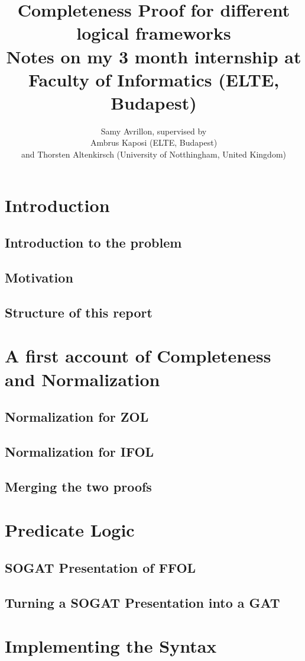 \documentclass[10pt,a4paper]{article}
\title{Completeness Proof for different logical frameworks
	\\[1ex] \large Notes on my 3 month internship at Faculty of Informatics (ELTE, Budapest)}
\author{Samy Avrillon, supervised by
	\\[1ex] Ambrus Kaposi (ELTE, Budapest)
	\\[1ex] and Thorsten Altenkirsch (University of Notthingham, United Kingdom)}
\begin{document}
	
	\doparttoc
	\maketitle
	
	\hsep
	
	\tableofcontents
	
	\newpage
	
	\section{Introduction}
		\subsection{Introduction to the problem}
		\subsection{Motivation}
		\subsection{Structure of this report}
	\section{A first account of Completeness and Normalization}
		\subsection{Normalization for ZOL}
		\subsection{Normalization for IFOL}
		\subsection{Merging the two proofs}
	\section{Predicate Logic}
		\subsection{SOGAT Presentation of FFOL}
		\subsection{Turning a SOGAT Presentation into a GAT}
	\section{Implementing the Syntax}
\end{document}
